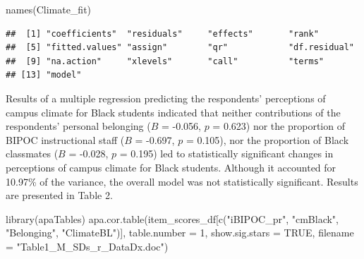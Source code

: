 \documentclass[
]{book}
\newenvironment{Shaded}{\begin{snugshade}}{\end{snugshade}}
\newcommand{\AttributeTok}[1]{\textcolor[rgb]{0.77,0.63,0.00}{#1}}
\newcommand{\ConstantTok}[1]{\textcolor[rgb]{0.00,0.00,0.00}{#1}}
\newcommand{\DecValTok}[1]{\textcolor[rgb]{0.00,0.00,0.81}{#1}}
\newcommand{\FunctionTok}[1]{\textcolor[rgb]{0.00,0.00,0.00}{#1}}
\newcommand{\NormalTok}[1]{#1}
\newcommand{\StringTok}[1]{\textcolor[rgb]{0.31,0.60,0.02}{#1}}
\begin{document}
\begin{Shaded}
\begin{Highlighting}[]
\FunctionTok{names}\NormalTok{(Climate\_fit)}
\end{Highlighting}
\end{Shaded}

\begin{verbatim}
##  [1] "coefficients"  "residuals"     "effects"       "rank"         
##  [5] "fitted.values" "assign"        "qr"            "df.residual"  
##  [9] "na.action"     "xlevels"       "call"          "terms"        
## [13] "model"
\end{verbatim}

Results of a multiple regression predicting the respondents' perceptions of campus climate for Black students indicated that neither contributions of the respondents' personal belonging (\(B\) = -0.056, \(p\) = 0.623) nor the proportion of BIPOC instructional staff (\(B\) = -0.697, \(p\) = 0.105), nor the proportion of Black classmates (\(B\) = -0.028, \(p\) = 0.195) led to statistically significant changes in perceptions of campus climate for Black students. Although it accounted for 10.97\% of the variance, the overall model was not statistically significant. Results are presented in Table 2.

\begin{Shaded}
\begin{Highlighting}[]
\FunctionTok{library}\NormalTok{(apaTables)}
\FunctionTok{apa.cor.table}\NormalTok{(item\_scores\_df[}\FunctionTok{c}\NormalTok{(}\StringTok{"iBIPOC\_pr"}\NormalTok{, }\StringTok{"cmBlack"}\NormalTok{, }\StringTok{"Belonging"}\NormalTok{, }\StringTok{"ClimateBL"}\NormalTok{)], }\AttributeTok{table.number =} \DecValTok{1}\NormalTok{, }\AttributeTok{show.sig.stars =} \ConstantTok{TRUE}\NormalTok{, }\AttributeTok{filename =} \StringTok{"Table1\_M\_SDs\_r\_DataDx.doc"}\NormalTok{)}
\end{Highlighting}
\end{Shaded}
\end{document}

